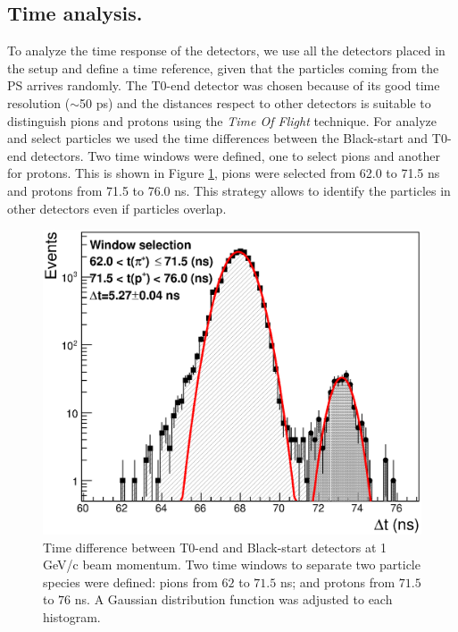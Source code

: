 	\subsection{Time analysis.}\label{section:TimeMeasurement}
	
	To analyze the time response of the detectors, we use all the detectors placed in the setup and 
	define a time reference, given that the particles coming from the PS arrives randomly. %
	The T0-end detector was chosen because of its good time resolution ($\sim$50 ps) \cite{T0detector} and the 
	distances respect to other detectors is suitable to distinguish pions and protons using the \textit{Time Of 
	Flight} technique.
	For analyze and select particles we used the time differences between the Black-start and T0-end detectors.
	Two time windows were defined, one to select pions and another for protons. %
	This is shown in Figure \ref{figure:ParSel_1GeV}, pions were selected from 62.0 to 71.5 ns and protons from 71.5 to 76.0 ns. 
	This strategy allows to identify the particles in other detectors even if particles overlap.
	
	\begin{figure}[hb!]
	  \begin{center}
		\includegraphics[scale=0.40]{./images/time/1GeV/NotepPiSelH1.eps}%
		\caption{
			Time difference between T0-end and Black-start detectors at 
			1 GeV/c beam momentum. 
			Two time windows to separate two particle species were defined: 
			pions from $62$ to $71.5$ ns; and protons from $71.5$ to $76$ ns.
			A Gaussian distribution function was adjusted to each histogram.
		}
		\label{figure:ParSel_1GeV}
	  \end{center}
	\end{figure}
	
